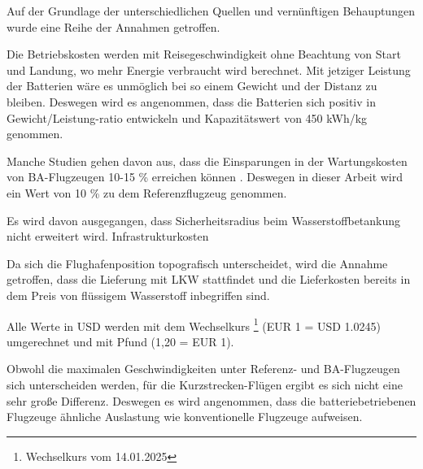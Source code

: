 
Auf der Grundlage der unterschiedlichen Quellen und vernünftigen Behauptungen wurde eine Reihe der Annahmen getroffen.

Die Betriebskosten werden mit Reisegeschwindigkeit ohne Beachtung von Start und Landung, wo mehr Energie verbraucht wird berechnet.
Mit jetziger Leistung der Batterien wäre es unmöglich bei so einem Gewicht und der Distanz zu bleiben.
Deswegen wird es angenommen, dass die Batterien sich positiv in Gewicht/Leistung-ratio entwickeln und Kapazitätswert von 450 kWh/kg genommen.

Manche Studien gehen davon aus, dass die Einsparungen in der Wartungskosten von BA-Flugzeugen 10-15 \% erreichen können 
\cite{wangsness2021fremskyndet,avogadro2024demystifying}. Deswegen in dieser Arbeit wird ein Wert von 10 \% zu dem Referenzflugzeug genommen.

Es wird davon ausgegangen, dass Sicherheitsradius beim Wasserstoffbetankung nicht erweitert wird. 
Infrastrukturkosten

Da sich die Flughafenposition topografisch unterscheidet, wird die Annahme getroffen, dass die Lieferung mit LKW stattfindet 
und die Lieferkosten bereits in dem Preis von flüssigem Wasserstoff inbegriffen sind.

Alle Werte in USD werden mit dem Wechselkurs \footnote{Wechselkurs vom 14.01.2025} (EUR 1 = USD 1.0245) umgerechnet und mit Pfund (1,20 = EUR 1).




Obwohl die maximalen Geschwindigkeiten unter Referenz- und BA-Flugzeugen sich unterscheiden werden, 
für die Kurzstrecken-Flügen ergibt es sich nicht eine sehr große Differenz.
Deswegen es wird angenommen, dass die batteriebetriebenen Flugzeuge ähnliche Auslastung wie konventionelle Flugzeuge aufweisen.

